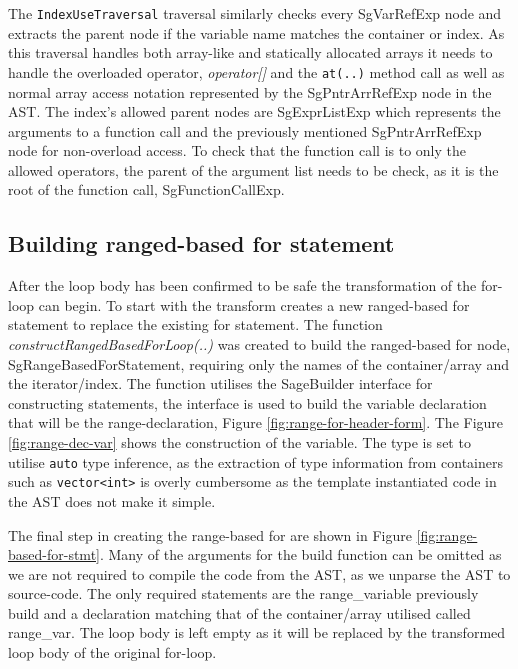\documentclass[bsc,frontabs,singlespacing,twoside,parskip,deptreport]{infthesis}
\begin{document}
The \texttt{IndexUseTraversal} traversal similarly checks every SgVarRefExp node and extracts the parent node if the variable name matches the container or index. As this traversal handles both array-like and statically allocated arrays it needs to handle the overloaded operator, \textit{operator[]} and the \texttt{at(..)} method call as well as normal array access notation represented by the SgPntrArrRefExp node in the AST. The index's allowed parent nodes are SgExprListExp which represents the arguments to a function call and the previously mentioned SgPntrArrRefExp node for non-overload access. To check that the function call is to only the allowed operators, the parent of the argument list needs to be check, as it is the root of the function call, SgFunctionCallExp.


\subsection{Building ranged-based for statement}\label{sec:build-range-for}

After the loop body has been confirmed to be safe the transformation of the for-loop can begin. To start with the transform creates a new ranged-based for statement to replace the existing for statement. The function \textit{constructRangedBasedForLoop(..)} was created to build the ranged-based for node, SgRangeBasedForStatement, requiring only the names of the container/array and the iterator/index. The function utilises the SageBuilder interface for constructing statements, the interface is used to build the variable declaration that will be the range-declaration, Figure \ref{fig:range-for-header-form}. The Figure \ref{fig:range-dec-var} shows the construction of the variable. The type is set to utilise \texttt{auto} type inference, as the extraction of type information from containers such as \texttt{vector<int>} is overly cumbersome as the template instantiated code in the AST does not make it simple. 

The final step in creating the range-based for are shown in Figure \ref{fig:range-based-for-stmt}. Many of the arguments for the build function can be omitted as we are not required to compile the code from the AST, as we unparse the AST to source-code. The only required statements are the range\_variable previously build and a declaration matching that of the container/array utilised called range\_var. The loop body is left empty as it will be replaced by the transformed loop body of the original for-loop.
\end{document}
